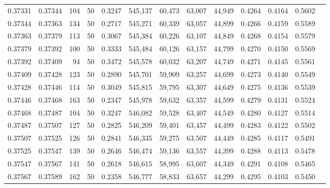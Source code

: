 \begin{tabular}{rrrrrrrrrrrrr}
0.37331 & 0.37344 &   104 &  50 &                                     0.3247 & 545,137 &  60,473 &  63,007 &  44,949 & 0.4264 & 0.4164 & 0.5602 \\
0.37344 & 0.37363 &   134 &  50 &                                     0.2717 & 545,271 &  60,339 &  63,057 &  44,899 & 0.4266 & 0.4159 & 0.5589 \\
0.37363 & 0.37379 &   113 &  50 &                                     0.3067 & 545,384 &  60,226 &  63,107 &  44,849 & 0.4268 & 0.4154 & 0.5579 \\
0.37379 & 0.37392 &   100 &  50 &                                     0.3333 & 545,484 &  60,126 &  63,157 &  44,799 & 0.4270 & 0.4150 & 0.5569 \\
0.37392 & 0.37409 &    94 &  50 &                                     0.3472 & 545,578 &  60,032 &  63,207 &  44,749 & 0.4271 & 0.4145 & 0.5561 \\
0.37409 & 0.37428 &   123 &  50 &                                     0.2890 & 545,701 &  59,909 &  63,257 &  44,699 & 0.4273 & 0.4140 & 0.5549 \\
0.37428 & 0.37446 &   114 &  50 &                                     0.3049 & 545,815 &  59,795 &  63,307 &  44,649 & 0.4275 & 0.4136 & 0.5539 \\
0.37446 & 0.37468 &   163 &  50 &                                     0.2347 & 545,978 &  59,632 &  63,357 &  44,599 & 0.4279 & 0.4131 & 0.5524 \\
0.37468 & 0.37487 &   104 &  50 &                                     0.3247 & 546,082 &  59,528 &  63,407 &  44,549 & 0.4280 & 0.4127 & 0.5514 \\
0.37487 & 0.37507 &   127 &  50 &                                     0.2825 & 546,209 &  59,401 &  63,457 &  44,499 & 0.4283 & 0.4122 & 0.5502 \\
0.37507 & 0.37525 &   126 &  50 &                                     0.2841 & 546,335 &  59,275 &  63,507 &  44,449 & 0.4285 & 0.4117 & 0.5491 \\
0.37525 & 0.37547 &   139 &  50 &                                     0.2646 & 546,474 &  59,136 &  63,557 &  44,399 & 0.4288 & 0.4113 & 0.5478 \\
0.37547 & 0.37567 &   141 &  50 &                                     0.2618 & 546,615 &  58,995 &  63,607 &  44,349 & 0.4291 & 0.4108 & 0.5465 \\
0.37567 & 0.37589 &   162 &  50 &                                     0.2358 & 546,777 &  58,833 &  63,657 &  44,299 & 0.4295 & 0.4103 & 0.5450 \\

\end{tabular}
